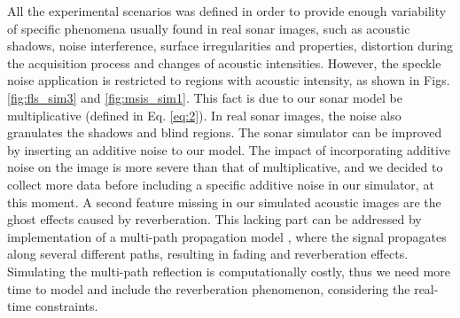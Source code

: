\documentclass[final,5p,times]{elsarticle}
\begin{document}
All the experimental scenarios was defined in order to provide enough variability of specific phenomena usually found in real sonar images, such as acoustic shadows, noise interference, surface irregularities and properties, distortion during the acquisition process and changes of acoustic intensities. However, the speckle noise application is restricted to regions with acoustic intensity, as shown in Figs. \ref{fig:fls_sim3} and \ref{fig:msis_sim1}. This fact is due to our sonar model be multiplicative (defined in Eq. \ref{eq:2}). In real sonar images, the noise also granulates the shadows and blind regions. The sonar simulator can be improved by inserting an additive noise to our model.
The impact of incorporating additive noise on the image is more severe than that of multiplicative, and we decided to collect more data before including a specific additive noise in our simulator, at this moment. A second feature missing in our simulated acoustic images are the ghost effects caused by reverberation. This lacking part can be addressed by implementation of a multi-path propagation model \cite{huang2015b}, where the signal propagates along several different paths, resulting in fading and reverberation effects. Simulating the multi-path reflection is computationally costly, thus we need more time to model and include the reverberation phenomenon, considering the real-time constraints.
\end{document}
